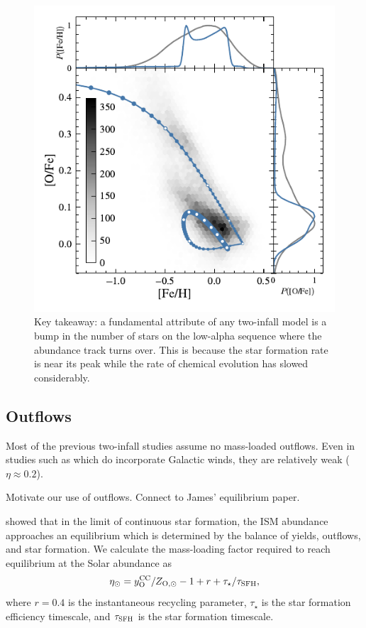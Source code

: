 \documentclass[twocolumn,twocolappendix,linenumbers]{aastex631}
\newcommand{\todo}[1]{{\color{red}#1}}
\begin{document}
\begin{figure}
    \centering
    \includegraphics{figures/onezone_sfr.pdf}
    \caption{Key takeaway: a fundamental attribute of any two-infall model is a bump in the number of stars on the low-alpha sequence where the abundance track turns over. This is because the star formation rate is near its peak while the rate of chemical evolution has slowed considerably.}
    \label{fig:onezone-sfr}
\end{figure}

\subsection{Outflows}
\label{sec:outflows}

Most of the previous two-infall studies assume no mass-loaded outflows. Even in studies such as \citet{palicio_analytic_2023} which do incorporate Galactic winds, they are relatively weak ($\eta\approx0.2$). 

\todo{Motivate our use of outflows. Connect to James' equilibrium paper.}

\citet{weinberg_equilibrium_2017} showed that in the limit of continuous star formation, the ISM abundance approaches an equilibrium which is determined by the balance of yields, outflows, and star formation. We calculate the mass-loading factor required to reach equilibrium at the Solar abundance as
\begin{equation}
    \eta_\odot = y_{\rm O}^{\rm CC} / Z_{\rm O,\odot} - 1 + r + \tau_\star / \tau_{\rm SFH},
\end{equation}
where $r=0.4$ is the instantaneous recycling parameter, $\tau_\star$ is the star formation efficiency timescale, and $\tau_{\rm SFH}$ is the star formation timescale.
\end{document}
